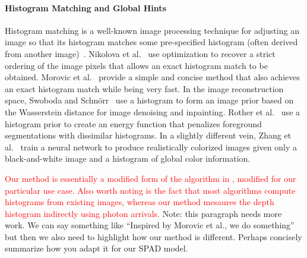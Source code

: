 \paragraph{Histogram Matching and Global Hints}
%
Histogram matching is a well-known image processing technique for adjusting an image so that its histogram matches some pre-specified histogram (often derived from another image)~\cite{gonzales1977gray,Gonzalez2008}. Nikolova et al.~\cite{Nikolova2013} use optimization to recover a strict ordering of the image pixels that allows an exact histogram match to be obtained. Morovic et al.~\cite{Morovic2002} provide a simple and concise method that also achieves an exact histogram match while being very fast. In the image reconstruction space, Swoboda and Schn\"orr~\cite{Swoboda2013} use a histogram to form an image prior based on the Wasserstein distance for image denoising and inpainting. Rother et al.~\cite{Rother2006} use a histogram prior to create an energy function that penalizes foreground segmentations with dissimilar histograms. In a slightly different vein, Zhang et al.~\cite{Zhang2017} train a neural network to produce realistically colorized images given only a black-and-white image and a histogram of global color information.

\textcolor{red}{Our method is essentially a modified form of the algorithm in \cite{Morovic2002}, modified for our particular use case. Also worth noting is the fact that most algorithms compute histograms from existing images, whereas our method mesaures the depth histogram indirectly using photon arrivals.} Note: this paragraph needs more work. We can say something like ``Inspired by Morovic et al., we do something'' but then we also need to highlight how our method is different. Perhaps concisely summarize how you adapt it for our SPAD model.
%


